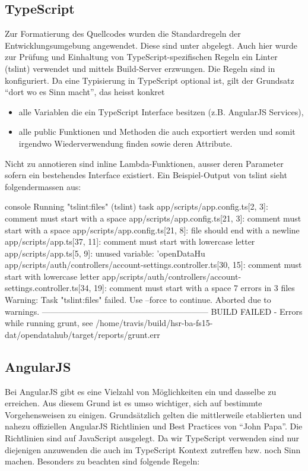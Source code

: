\subsection{TypeScript}
Zur Formatierung des Quellcodes wurden die Standardregeln der Entwicklungsumgebung angewendet. Diese sind unter  abgelegt. Auch hier wurde zur Prüfung und Einhaltung von TypeScript-spezifischen Regeln ein Linter (tslint) verwendet und mittels Build-Server erzwungen. Die Regeln sind in  konfiguriert. Da eine Typisierung in TypeScript optional ist, gilt der Grundsatz ``dort wo es Sinn macht'', das heisst konkret
\begin{itemize}
\item alle Variablen die ein TypeScript Interface besitzen (z.B. AngularJS Services),
\item alle public Funktionen und Methoden die auch exportiert werden und somit irgendwo Wiederverwendung finden sowie deren Attribute.
\end{itemize}

Nicht zu annotieren sind inline Lambda-Funktionen, ausser deren Parameter sofern ein bestehendes Interface existiert. Ein Beispiel-Output von tslint sieht folgendermassen aus:

\begin{src}{console}
Running "tslint:files" (tslint) task
app/scripts/app.config.ts[2, 3]: comment must start with a space
app/scripts/app.config.ts[21, 3]: comment must start with a space
app/scripts/app.config.ts[21, 8]: file should end with a newline
app/scripts/app.ts[37, 11]: comment must start with lowercase letter
app/scripts/app.ts[5, 9]: unused variable: 'openDataHu
app/scripts/auth/controllers/account-settings.controller.ts[30, 15]: comment must start with lowercase letter
app/scripts/auth/controllers/account-settings.controller.ts[34, 19]: comment must start with a space
7 errors in 3 files
Warning: Task "tslint:files" failed. Use --force to continue.
Aborted due to warnings.
------------------------------------------------------------
BUILD FAILED - Errors while running grunt, see /home/travis/build/hsr-ba-fs15-dat/opendatahub/target/reports/grunt.err
\end{src}


\subsection{AngularJS}
Bei AngularJS gibt es eine Vielzahl von Möglichkeiten ein und dasselbe zu erreichen. Aus diesem Grund ist es umso wichtiger, sich auf bestimmte Vorgehensweisen zu einigen. Grundsätzlich gelten die mittlerweile etablierten und nahezu offiziellen AngularJS Richtlinien und Best Practices von ``John Papa''\cite{angular-styleguide}. Die Richtlinien sind auf JavaScript ausgelegt. Da wir TypeScript verwenden sind nur diejenigen anzuwenden die auch im TypeScript Kontext zutreffen bzw. noch Sinn machen. Besonders zu beachten sind folgende Regeln:


